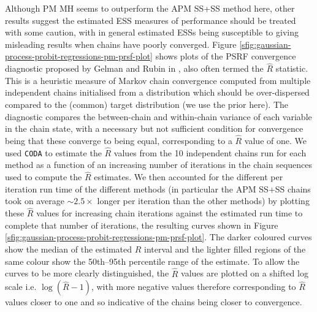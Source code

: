 Although \ac{PM} \ac{MH} seems to outperform the \ac{APM} \ac{SS}+\ac{SS} method here, other results suggest the estimated \ac{ESS} measures of performance should be treated with some caution, with in general estimated \acp{ESS} being susceptible to giving misleading results when chains have poorly converged. Figure \ref{sfig:gaussian-process-probit-regressions-pm-prsf-plot} shows plots of the \ac{PSRF} convergence diagnostic proposed by Gelman and Rubin in \citep{gelman1992inference}, also often termed the $\hat{R}$ statistic. This is a heuristic measure of Markov chain convergence computed from multiple independent chains initialised from a distribution which should be over-dispersed compared to the (common) target distribution (we use the prior here). The diagnostic compares the between-chain and within-chain variance of each variable in the chain state, with a necessary but not sufficient condition for convergence being that these converge to being equal, corresponding to a $\hat{R}$ value of one. We used \texttt{CODA} to estimate the $\hat{R}$ values from the 10 independent chains run for each method as a function of an increasing number of iterations in the chain sequences used to compute the $\hat{R}$ estimates. We then accounted for the different per iteration run time of the different methods (in particular the \ac{APM} \ac{SS}+\ac{SS} chains took on average $\sim 2.5\times$ longer per iteration than the other methods) by plotting these $\hat{R}$ values for increasing chain iterations against the estimated run time to complete that number of iterations, the resulting curves shown in Figure \ref{sfig:gaussian-process-probit-regressions-pm-prsf-plot}. The darker coloured curves show the median of the estimated $\hat{R}$ interval and the lighter filled regions of the same colour show the 50th--95th percentile range of the estimate. To allow the curves to be more clearly distinguished, the $\hat{R}$ values are plotted on a shifted log scale i.e. $\log(\hat{R} - 1)$, with more negative values therefore corresponding to $\hat{R}$ values closer to one and so indicative of the chains being closer to convergence.

